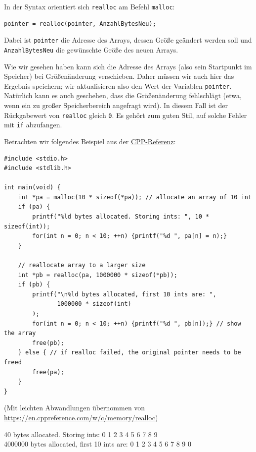 In der Syntax orientiert sich \texttt{realloc} am Befehl \texttt{malloc}:

\begin{codebox}
\begin{verbatim}
pointer = realloc(pointer, AnzahlBytesNeu);
\end{verbatim}
\end{codebox}

Dabei ist \texttt{pointer} die Adresse des Arrays, dessen Größe geändert werden soll und \texttt{AnzahlBytesNeu} die gewünschte Größe des neuen Arrays.

Wie wir gesehen haben kann sich die Adresse des Arrays (also sein Startpunkt im Speicher) bei Größenänderung verschieben. Daher müssen wir auch hier das Ergebnis speichern; wir aktualisieren also den Wert der Variablen \texttt{pointer}. Natürlich kann es auch geschehen, dass die Größenänderung fehlschlägt (etwa, wenn ein zu großer Speicherbereich angefragt wird). In diesem Fall ist der Rückgabewert von \texttt{realloc} gleich \texttt{0}. Es gehört zum guten Stil, auf solche Fehler mit \texttt{if} abzufangen.

Betrachten wir folgendes Beispiel aus der \href{https://en.cppreference.com/w/c/memory/realloc}{CPP-Referenz}:

\begin{codebox}
\begin{verbatim}
#include <stdio.h>
#include <stdlib.h>

int main(void) {
    int *pa = malloc(10 * sizeof(*pa)); // allocate an array of 10 int
    if (pa) {
        printf("%ld bytes allocated. Storing ints: ", 10 * sizeof(int));
        for(int n = 0; n < 10; ++n) {printf("%d ", pa[n] = n);}
    }

    // reallocate array to a larger size
    int *pb = realloc(pa, 1000000 * sizeof(*pb));
    if (pb) {
        printf("\n%ld bytes allocated, first 10 ints are: ",
               1000000 * sizeof(int)
        );
        for(int n = 0; n < 10; ++n) {printf("%d ", pb[n]);} // show the array
        free(pb);
    } else { // if realloc failed, the original pointer needs to be freed
        free(pa);
    }
}
\end{verbatim}
{\normalfont(Mit leichten Abwandlungen übernommen von \url{https://en.cppreference.com/w/c/memory/realloc})}
\end{codebox}

\begin{cmdbox}
40 bytes allocated. Storing ints: 0 1 2 3 4 5 6 7 8 9 \\
4000000 bytes allocated, first 10 ints are: 0 1 2 3 4 5 6 7 8 9 0
\end{cmdbox}

